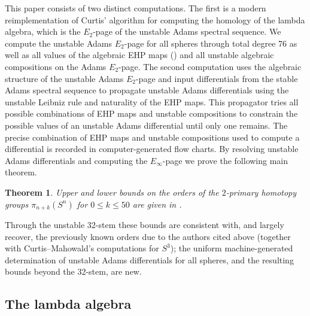 \documentclass[dvipsnames,table]{amsart}
\newtheorem{theorem}{Theorem}[section]
\theoremstyle{definition}
\theoremstyle{remark}
\numberwithin{equation}{section}
\begin{document}
This paper consists of two distinct computations.
The first is a modern reimplementation of Curtis' algorithm for computing the homology of the lambda algebra, which is the $E_2$-page of the unstable Adams spectral sequence. We compute the unstable Adams $E_2$-page for all spheres through total degree 76 as well as all values of the algebraic EHP maps () and all unstable algebraic compositions on the Adams $E_2$-page. The second computation uses the algebraic structure of the unstable Adams $E_2$-page and input differentials from the stable Adams spectral sequence to propagate unstable Adams differentials using the unstable Leibniz rule and naturality of the EHP maps. This propagator tries all possible combinations of EHP maps and unstable compositions to constrain the possible values of an unstable Adams differential until only one remains. The precise combination of EHP maps and unstable compositions used to compute a differential is recorded in computer-generated flow charts. By resolving unstable Adams differentials and computing the $E_\infty$-page we prove the following main theorem. 

\begin{theorem}
\label{thm:main}
Upper and lower bounds on the orders of the $2$-primary homotopy groups $\pi_{n+k}(S^n)$ for $0 \le k \le 50$ are given in .
\end{theorem}
\noindent Through the unstable 32-stem these bounds are consistent with, and largely recover, the previously known orders due to the authors cited above (together with Curtis--Mahowald's computations for $S^3$); the uniform machine-generated determination of unstable Adams differentials for all spheres, and the resulting bounds beyond the 32-stem, are new.


\subsection{The lambda algebra}
\end{document}
